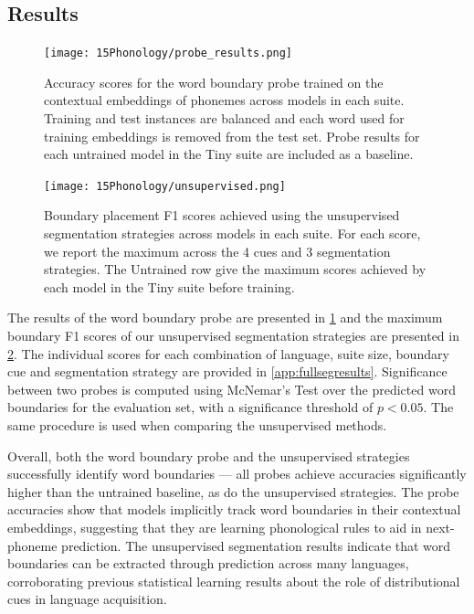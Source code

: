 \subsection{Results}

\begin{figure}[t]
    \centering
    \texttt{[image: 15Phonology/probe\_results.png]}
    \caption{Accuracy scores for the word boundary probe trained on the contextual embeddings of phonemes across models in each suite. Training and test instances are balanced and each word used for training embeddings is removed from the test set. Probe results for each untrained model in the Tiny suite are included as a baseline.}
    \label{fig:15-probes}
\end{figure}

\begin{figure}[t]
    \centering
    \texttt{[image: 15Phonology/unsupervised.png]}
    \caption{Boundary placement F1 scores achieved using the unsupervised segmentation strategies across models in each suite. For each score, we report the maximum across the 4 cues and 3 segmentation strategies. The Untrained row give the maximum scores achieved by each model in the Tiny suite before training.}
    \label{fig:15-unsupervised}
\end{figure}


The results of the word boundary probe are presented in \cref{fig:15-probes} and the maximum boundary F1 scores of our unsupervised segmentation strategies are presented in \cref{fig:15-unsupervised}. The individual scores for each combination of language, suite size, boundary cue and segmentation strategy are provided in \cref{app:fullsegresults}. Significance between two probes is computed using McNemar's Test \citep{McNemar_1947} over the predicted word boundaries for the evaluation set, with a significance threshold of $p<0.05$. The same procedure is used when comparing the unsupervised methods.

Overall, both the word boundary probe and the unsupervised strategies successfully identify word boundaries --- all probes achieve accuracies significantly higher than the untrained baseline, as do the unsupervised strategies. The probe accuracies show that models implicitly track word boundaries in their contextual embeddings, suggesting that they are learning phonological rules to aid in next-phoneme prediction. The unsupervised segmentation results indicate that word boundaries can be extracted through prediction across many languages, corroborating previous statistical learning results about the role of distributional cues in language acquisition.

